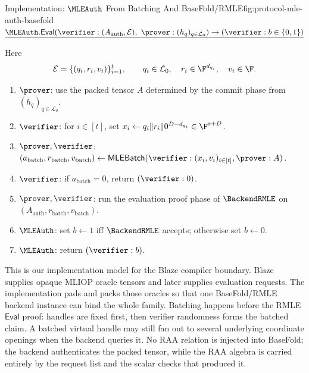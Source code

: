 \begin{protocolbox}{Implementation: \(\MLEAuth\) From Batching And BaseFold/RMLE}{fig:protocol-mle-auth-basefold}
\smallskip
\noindent\(\underline{\MLEAuth.\mathsf{Eval}(\verifier:(A_{\mathrm{auth}},\mathcal E),\ \prover:(h_q)_{q\in\mathcal L_0})\to(\verifier:b\in\{0,1\})}\)

\smallskip
\noindent Here
\[
  \mathcal E=\{(q_i,r_i,v_i)\}_{i=1}^t,
  \qquad
  q_i\in\mathcal L_0,\quad r_i\in\F^{d_{q_i}},\quad v_i\in\F.
\]

\smallskip
\begin{enumerate}[leftmargin=0.24in,label=\textbf{O\arabic*.},itemsep=0.06em,topsep=0.06em,parsep=0pt]
  \item \(\prover\): use the packed tensor \(A\) determined by the commit
        phase from \((h_q)_{q\in\mathcal L_0}\).
  \item \(\verifier\): for \(i\in[t]\), set
        \(x_i\gets q_i\Vert r_i\Vert0^{D-d_{q_i}}\in\F^{s+D}\).
  \item \(\prover,\verifier\):
        \((a_{\mathrm{batch}},r_{\mathrm{batch}},v_{\mathrm{batch}})
        \gets\mathsf{MLEBatch}
        (\verifier:(x_i,v_i)_{i\in[t]},\prover:A)\).
  \item \(\verifier\): if \(a_{\mathrm{batch}}=0\), return
        \((\verifier:0)\).
  \item \(\prover,\verifier\): run the evaluation proof phase of
        \(\BackendRMLE\) on
        \((A_{\mathrm{auth}},r_{\mathrm{batch}},v_{\mathrm{batch}})\).
  \item \(\MLEAuth\): set \(b\gets1\) iff \(\BackendRMLE\) accepts;
        otherwise set \(b\gets0\).
  \item \(\MLEAuth\): return \((\verifier:b)\).
\end{enumerate}
\end{protocolbox}

This is our implementation model for the Blaze compiler boundary.  Blaze
supplies opaque MLIOP oracle tensors and later supplies evaluation requests.
The implementation pads and packs those oracles so that one BaseFold/RMLE
backend instance can bind the whole family.  Batching happens before the RMLE
\(\mathsf{Eval}\) proof:
handles are fixed first, then verifier randomness forms the batched claim.  A
batched virtual handle may still fan out to several underlying coordinate
openings when the backend queries it.  No RAA relation is injected into
BaseFold; the backend authenticates the packed tensor, while the RAA algebra is
carried entirely by the request list and the scalar checks that produced it.
